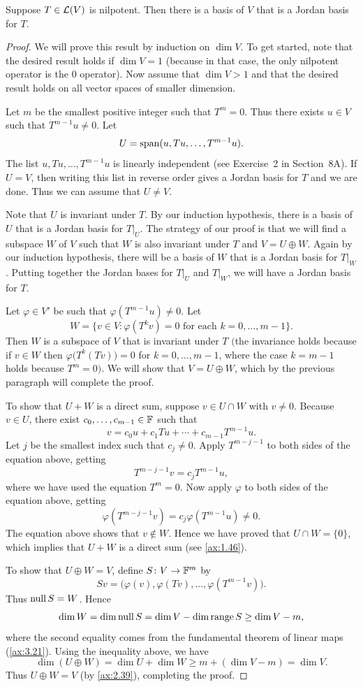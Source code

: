 \begin{result}\label{ax:8.45}
Suppose $T\in\mathcal{L}(V)$ is nilpotent. Then there is a basis of $V$ that is a
Jordan basis for $T$.
\end{result}

\begin{proof}
We will prove this result by induction on $\dim V$. To get started, note that
the desired result holds if $\dim V=1$ (because in that case, the only nilpotent
operator is the $0$ operator). Now assume that $\dim V>1$ and that the desired
result holds on all vector spaces of smaller dimension.

Let $m$ be the smallest positive integer such that $T^m=0$. Thus there exists
$u\in V$ such that $T^{m-1}u\ne0$. Let
\[ U = \operatorname{span}(u,Tu,\dots,T^{m-1}u). \]
The list $u,Tu,\dots,T^{m-1}u$ is linearly independent (see Exercise~2 in
Section~8A). If $U=V$, then writing this list in reverse order gives a Jordan
basis for $T$ and we are done. Thus we can assume that $U\ne V$.

Note that $U$ is invariant under $T$. By our induction hypothesis, there is a
basis of $U$ that is a Jordan basis for $T|_U$. The strategy of our proof is
that we will find a subspace $W$ of $V$ such that $W$ is also invariant under
$T$ and $V=U\oplus W$. Again by our induction hypothesis, there will be a basis
of $W$ that is a Jordan basis for $T|_W$. Putting together the Jordan bases for
$T|_U$ and $T|_W$, we will have a Jordan basis for $T$.

Let $\varphi\in V'$ be such that $\varphi(T^{m-1}u)\ne0$. Let
\[ W = \bigl\{v\in V : \varphi(T^kv)=0 \text{ for each } k=0,\dots,m-1\bigr\}. \]
Then $W$ is a subspace of $V$ that is invariant under $T$ $\bigl($the invariance
holds because if $v\in W$ then $\varphi\bigl(T^k(Tv)\bigr)=0$ for
$k=0,\dots,m-1$, where the case $k=m-1$ holds because $T^m=0\bigr)$. We will
show that $V=U\oplus W$, which by the previous paragraph will complete the
proof.

To show that $U+W$ is a direct sum, suppose $v\in U\cap W$ with $v\ne0$.
Because $v\in U$, there exist $c_0,\dots,c_{m-1}\in\mathbb{F}$ such that
\[ v = c_0u + c_1Tu + \cdots + c_{m-1}T^{m-1}u. \]
Let $j$ be the smallest index such that $c_j\ne0$. Apply $T^{m-j-1}$ to both
sides of the equation above, getting
\[ T^{m-j-1}v = c_jT^{m-1}u, \]
where we have used the equation $T^m=0$. Now apply $\varphi$ to both sides of
the equation above, getting
\[ \varphi(T^{m-j-1}v) = c_j\varphi(T^{m-1}u) \ne 0. \]
The equation above shows that $v\notin W$. Hence we have proved that
$U\cap W=\{0\}$, which implies that $U+W$ is a direct sum (see
\ref{ax:1.46}).

To show that $U\oplus W=V$, define $S\colon V\to\mathbb{F}^m$ by
\[ Sv = \bigl(\varphi(v),\varphi(Tv),\dots,\varphi(T^{m-1}v)\bigr). \]
Thus $\operatorname{null} S=W$. Hence
\[ \operatorname{dim} W = \operatorname{dim}\operatorname{null} S = \operatorname{dim} V - \operatorname{dim}\operatorname{range} S \ge \operatorname{dim} V - m, \]
where the second equality comes from the fundamental theorem of linear maps
(\ref{ax:3.21}). Using the inequality above, we have
\[ \dim(U\oplus W) = \dim U + \dim W \ge m + (\dim V - m) = \dim V. \]
Thus $U\oplus W=V$ (by \ref{ax:2.39}), completing the proof.
\end{proof}

